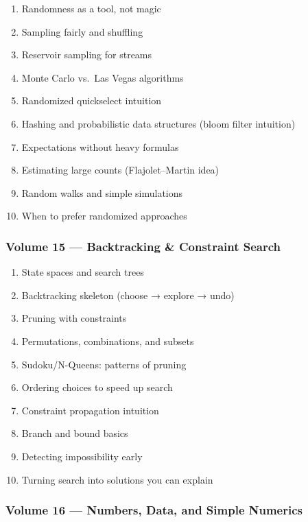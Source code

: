 \documentclass[
  letterpaper,
  DIV=11,
  numbers=noendperiod]{scrreprt}
\providecommand{\tightlist}{%
  \setlength{\itemsep}{0pt}\setlength{\parskip}{0pt}}
\begin{document}
\begin{enumerate}
\def\labelenumi{\arabic{enumi}.}
\setcounter{enumi}{130}
\tightlist
\item
  Randomness as a tool, not magic
\item
  Sampling fairly and shuffling
\item
  Reservoir sampling for streams
\item
  Monte Carlo vs.~Las Vegas algorithms
\item
  Randomized quickselect intuition
\item
  Hashing and probabilistic data structures (bloom filter intuition)
\item
  Expectations without heavy formulas
\item
  Estimating large counts (Flajolet--Martin idea)
\item
  Random walks and simple simulations
\item
  When to prefer randomized approaches
\end{enumerate}

\subsubsection{Volume 15 --- Backtracking \& Constraint
Search}\label{volume-15-backtracking-constraint-search}

\begin{enumerate}
\def\labelenumi{\arabic{enumi}.}
\setcounter{enumi}{140}
\tightlist
\item
  State spaces and search trees
\item
  Backtracking skeleton (choose → explore → undo)
\item
  Pruning with constraints
\item
  Permutations, combinations, and subsets
\item
  Sudoku/N-Queens: patterns of pruning
\item
  Ordering choices to speed up search
\item
  Constraint propagation intuition
\item
  Branch and bound basics
\item
  Detecting impossibility early
\item
  Turning search into solutions you can explain
\end{enumerate}

\subsubsection{Volume 16 --- Numbers, Data, and Simple
Numerics}\label{volume-16-numbers-data-and-simple-numerics}
\end{document}
